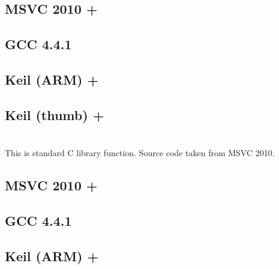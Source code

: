 \subsection{MSVC 2010 + \Ox}



\subsection{GCC 4.4.1}



\subsection{Keil (ARM) + \Othree}



\subsection{Keil (thumb) + \Othree}



\section{}

{This is standard C library function. Source code taken from MSVC 2010.}

\subsection{MSVC 2010 + \Ox}



\subsection{GCC 4.4.1}



\subsection{Keil (ARM) + \Othree}




